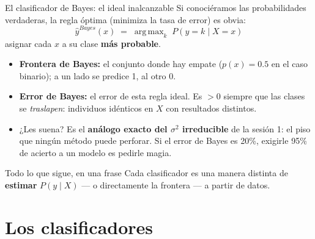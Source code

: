 \documentclass{beamer}
\newcommand{\1}{\mathbb{I}}
\DeclareMathOperator*{\argmax}{arg\,max}
\begin{document}
\begin{frame}{El clasificador de Bayes: el ideal inalcanzable}
\small
Si conociéramos las probabilidades verdaderas, la regla óptima (minimiza la tasa de error) es obvia:
\[ \hat{y}^{Bayes}(x) \;=\; \argmax_{k} \; P(y = k \mid X = x) \]
asignar cada $x$ a su clase \textbf{más probable}.
\pause

\vspace{0.2cm}
\begin{itemize}\itemsep5pt
  \item \textbf{Frontera de Bayes:} el conjunto donde hay empate ($p(x) = 0.5$ en el caso binario); a un lado se predice 1, al otro 0.
  \item \textbf{Error de Bayes:} el error de esta regla ideal. Es $> 0$ siempre que las clases se \emph{traslapen}: individuos idénticos en $X$ con resultados distintos. \pause
  \item ¿Les suena? Es el \textbf{análogo exacto del $\sigma^2$ irreducible} de la sesión 1: el piso que ningún método puede perforar. Si el error de Bayes es 20\%, exigirle 95\% de acierto a un modelo es pedirle magia. \pause
\end{itemize}

\vspace{0.1cm}
\begin{block}{Todo lo que sigue, en una frase}
Cada clasificador es una manera distinta de \textbf{estimar} $P(y \mid X)$ --- o directamente la frontera --- a partir de datos.
\end{block}
\end{frame}


\section{Los clasificadores}
\begin{frame}[noframenumbering]
\tableofcontents[currentsection]
\end{frame}
\end{document}
